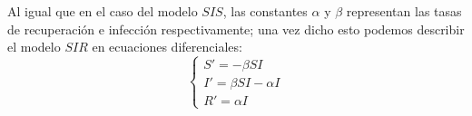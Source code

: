 Al igual que en el caso del modelo $SIS$, las constantes $\alpha$ y $\beta$ representan las tasas de recuperación e infección respectivamente; una vez dicho esto podemos describir el modelo $SIR$ en ecuaciones diferenciales:
\begin{equation}
    \left\{
    \begin{array}{l}
        S' = -\beta SI \\
        I' = \beta SI-\alpha I \\
        R' = \alpha I
    \end{array}
    \right.\label{equ3}
\end{equation}
